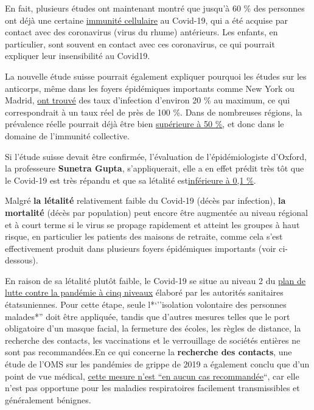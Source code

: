 En fait, plusieurs études ont maintenant montré que jusqu'à 60 \% des
personnes ont déjà une certaine
\href{https://www.cell.com/cell/fulltext/S0092-8674(20)30610-3}{immunité
cellulaire} au Covid-19, qui a été acquise par contact avec des
coronavirus (virus du rhume) antérieurs. Les enfants, en particulier,
sont souvent en contact avec ces coronavirus, ce qui pourrait expliquer
leur insensibilité au Covid19.

La nouvelle étude suisse pourrait également expliquer pourquoi les
études sur les anticorps, même dans les foyers épidémiques importants
comme New York ou Madrid,
\href{https://www.governor.ny.gov/news/amid-ongoing-covid-19-pandemic-governor-cuomo-announces-results-completed-antibody-testing}{ont
trouvé} des taux d'infection d'environ 20 \% au maximum, ce qui
correspondrait à un taux réel de près de 100 \%. Dans de nombreuses
régions, la prévalence réelle pourrait déjà être bien
\href{https://swprs.org/studies-on-covid-19-lethality/}{supérieure à 50
\%}, et donc dans le domaine de l'immunité collective.

Si l'étude suisse devait être confirmée, l'évaluation de
l'épidémiologiste d'Oxford, la professeure \textbf{Sunetra Gupta},
s'appliquerait, elle a en effet prédit très tôt que le Covid-19 est très
répandu et que sa létalité
est\href{https://unherd.com/2020/05/oxford-doubles-down-sunetra-gupta-interview/}{inférieure
à 0,1 \%}.

Malgré \textbf{la létalité} relativement faible du Covid-19 (décès par
infection), \textbf{la mortalité} (décès par population) peut encore
être augmentée au niveau régional et à court terme si le virus se
propage rapidement et atteint les groupes à haut risque, en particulier
les patients des maisons de retraite, comme cela s'est effectivement
produit dans plusieurs foyers épidémiques importants (voir ci-dessous).

En raison de sa létalité plutôt faible, le Covid-19 se situe au niveau 2
du
\href{https://www.cidrap.umn.edu/news-perspective/2007/02/hhs-ties-pandemic-mitigation-advice-severity}{plan
de lutte contre la pandémie à cinq niveaux} élaboré par les autorités
sanitaires étatsuniennes. Pour cette étape, seule l*`''isolation
volontaire des personnes malades*'' doit être appliquée, tandis que
d'autres mesures telles que le port obligatoire d'un masque facial, la
fermeture des écoles, les règles de distance, la recherche des contacts,
les vaccinations et le verrouillage de sociétés entières ne sont pas
recommandées.En ce qui concerne la \textbf{recherche des contacts}, une
étude de l'OMS sur les pandémies de grippe de 2019 a également conclu
que d'un point de vue médical,
\href{https://apps.who.int/iris/bitstream/handle/10665/329438/9789241516839-eng.pdf}{cette
mesure n'est ``en aucun cas recommandée}``, car elle n'est pas opportune
pour les maladies respiratoires facilement transmissibles et
généralement bénignes.

